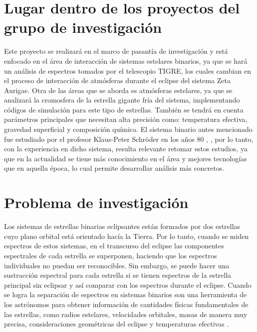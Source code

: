 \documentclass[11pt]{article}
\begin{document}
\section{Lugar dentro de los proyectos del grupo de investigación}
\noindent Este proyecto se realizará en el marco de pasantía de investigación y está enfocado en el área de interacción de sistemas estelares binarios, ya que se hará un análisis de espectros tomados por el telescopio TIGRE, los cuales cambian en el proceso de interacción de atmósferas durante el eclipse del sistema Zeta Aurigae. Otra de las áreas que se aborda es atmósferas estelares, ya que se analizará la cromosfera de la estrella gigante fría del sistema, implementando códigos de simulación para este tipo de estrellas. También se tendrá en cuenta parámetros principales que necesitan alta precisión como: temperatura efectiva, gravedad superficial y composición química. El sistema binario antes mencionado fue estudiado por el profesor Klaus-Peter Schröder en los años 80 \cite{kps9}, \cite{kps1O}, por lo tanto, con la experiencia en dicho sistema, resulta relevante retomar estos estudios, ya que en la actualidad se tiene más conocimiento en el área y mejores tecnologías que en aquella época, lo cual permite desarrollar análisis más concretos.

\section{Problema de investigación}

\noindent Los sistemas de estrellas binarias eclipsantes están formados por dos estrellas cuyo plano orbital está orientado hacía la Tierra. Por lo tanto, cuando se miden espectros de estos sistemas, en el transcurso del eclipse las componentes espectrales de cada estrella se superponen, haciendo que los espectros individuales no puedan ser reconocibles. Sin embargo, se puede hacer una sustracción espectral para cada estrella si se tienen espectros de la estrella principal sin eclipsar y así comparar con los espectros durante el eclipse. Cuando se logra la separación de espectros en sistemas binarios son una herramienta de los astrónomos para obtener información de cantidades físicas fundamentales de las estrellas, como radios estelares, velocidades orbitales, masas de manera muy precisa, consideraciones geométricas del eclipse y temperaturas efectivas \cite{schroder2009stars}.
\end{document}
